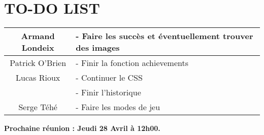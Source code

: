 \section*{TO-DO LIST}

\begin{center}
\begin{tabular}{|c|l|}
    \hline
    Armand Londeix & - Faire les succès et éventuellement trouver des images \\ 
    \hline
    Patrick O'Brien & - Finir la fonction achievements \\
    \hline
    Lucas Rioux & - Continuer le CSS \\
    & - Finir l'historique \\
    \hline
    Serge Téhé & - Faire les modes de jeu \\
    \hline
\end{tabular}
\end{center}

\tabto{0cm}\textbf{Prochaine réunion : Jeudi 28 Avril à 12h00.}

